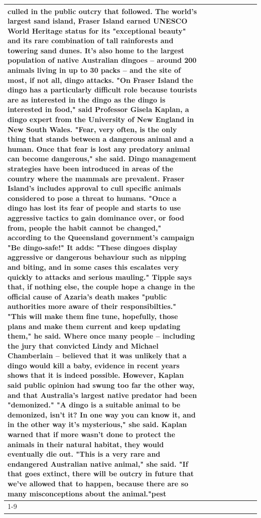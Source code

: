 \begin{table}[H]
\begin{tabular}{lllrlllll}
culled in the public outcry that followed. The world's largest sand island, Fraser Island earned UNESCO World Heritage status for its "exceptional beauty" and its rare combination of tall rainforests and towering sand dunes. It's also home to the largest population of native Australian dingoes -- around 200 animals living in up to 30 packs -- and the site of most, if not all, dingo attacks. "On Fraser Island the dingo has a particularly difficult role because tourists are as interested in the dingo as the dingo is interested in food," said Professor Gisela Kaplan, a dingo expert from the University of New England in New South Wales. "Fear, very often, is the only thing that stands between a dangerous animal and a human. Once that fear is lost any predatory animal can become dangerous," she said. Dingo management strategies have been introduced in areas of the country where the mammals are prevalent. Fraser Island's includes approval to cull specific animals considered to pose a threat to humans. "Once a dingo has lost its fear of people and starts to use aggressive tactics to gain dominance over, or food from, people the habit cannot be changed," according to the Queensland government's campaign "Be dingo-safe!" It adds: "These dingoes display aggressive or dangerous behaviour such as nipping and biting, and in some cases this escalates very quickly to attacks and serious mauling." Tipple says that, if nothing else, the couple hope a change in the official cause of Azaria's death makes "public authorities more aware of their responsibilties." "This will make them fine tune, hopefully, those plans and make them current and keep updating them," he said. Where once many people -- including the jury that convicted Lindy and Michael Chamberlain -- believed that it was unlikely that a dingo would kill a baby, evidence in recent years shows that it is indeed possible. However, Kaplan said public opinion had swung too far the other way, and that Australia's largest native predator had been "demonized." "A dingo is a suitable animal to be demonized, isn't it? In one way you can know it, and in the other way it's mysterious," she said. Kaplan warned that if more wasn't done to protect the animals in their natural habitat, they would eventually die out. "This is a very rare and endangered Australian native animal," she said. "If that goes extinct, there will be outcry in future that we've allowed that to happen, because there are so many misconceptions about the animal."pest \\
\cline{1-9}

\end{tabular}
\end{table}
